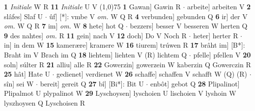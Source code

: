 \documentclass[8pt,a4paper,notitlepage]{article}
\begin{document}
\begin{table}[ht]
\begin{minipage}[t]{0.5\linewidth}
\textbf{1} \textit{Initiale} W R  \textbf{11} \textit{Initiale} U V  \newline
\line(1,0){75} \newline
\textbf{1} Gawan] Gawin R  $\cdot$ arbeite] arbeiten V \textbf{2} slâfes] Slaf U  $\cdot$ ûf] [*]: vmbe V \textit{om.} W Q R \textbf{4} verbunden] gebunden Q \textbf{6} ir] der V \textit{om.} W Q R \textbf{7} im] \textit{om.} W \textbf{8} hete] hot Q  $\cdot$ bezzers] besser V besseren W herten Q \textbf{9} des nahtes] \textit{om.} R \textbf{11} gein] nach V \textbf{12} doch] Do V Noch R  $\cdot$ heter] herter R  $\cdot$ in] in dem W \textbf{15} kamerære] kramere W \textbf{16} tiurem] trúwen R \textbf{17} brâht im] [B*]: Braht im V Brach im Q \textbf{18} liehtem] liehten V (R) lichtem Q  $\cdot$ pfelle] pfellen V \textbf{20} soln] súlter R \textbf{21} alliu] alle R \textbf{22} Gowerzin] gowerzein W kaberzin Q Gowerczin R \textbf{25} hât] Hate U  $\cdot$ gedienet] verdienet W \textbf{26} schaffe] schaffen V schafft W (Q) (R)  $\cdot$ sîn] sei W  $\cdot$ bereit] gereit Q \textbf{27} bî] [Bi*]: Bit U  $\cdot$ enbôt] gebot Q \textbf{28} Plipalinot] Plipalmot U plypalinot W \textbf{29} Lyschoysen] lyschoien U lischoien V lyshoin W lyszhoysen Q Lyschoisen R \newline
\end{minipage}
\end{table}
\end{document}
